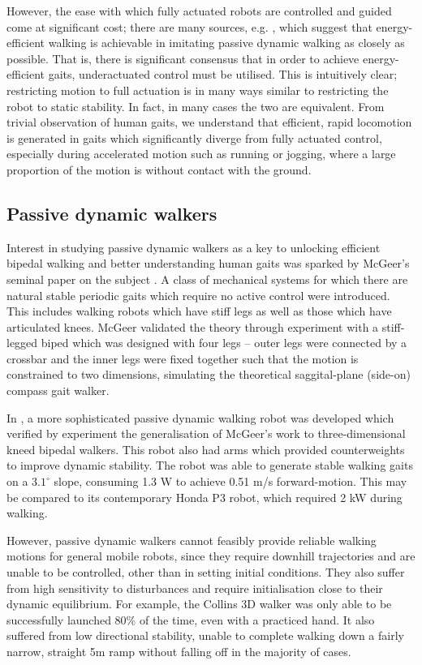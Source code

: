 However, the ease with which fully actuated robots are controlled and guided come at significant cost; there are many sources, e.g. \cite{mcgeer1990passive, asano2007dynamic, byl2008approximate}, which suggest that energy-efficient walking is achievable in imitating passive dynamic walking as closely as possible. That is, there is significant consensus that in order to achieve energy-efficient gaits, underactuated control must be utilised. This is intuitively clear; restricting motion to full actuation is in many ways similar to restricting the robot to static stability. In fact, in many cases the two are equivalent. From trivial observation of human gaits, we understand that efficient, rapid locomotion is generated in gaits which significantly diverge from fully actuated control, especially during accelerated motion such as running or jogging, where a large proportion of the motion is without contact with the ground.

\subsection{Passive dynamic walkers}
Interest in studying passive dynamic walkers as a key to unlocking efficient bipedal walking and better understanding human gaits was sparked by McGeer's seminal paper on the subject \cite{mcgeer1990passive}. A class of mechanical systems for which there are natural stable periodic gaits which require no active control were introduced. This includes walking robots which have stiff legs as well as those which have articulated knees. McGeer validated the theory through experiment with a stiff-legged biped which was designed with four legs -- outer legs were connected by a crossbar and the inner legs were fixed together such that the motion is constrained to two dimensions, simulating the theoretical saggital-plane (side-on) compass gait walker.

In \cite{collins2001three}, a more sophisticated passive dynamic walking robot was developed which verified by experiment the generalisation of McGeer's work to three-dimensional kneed bipedal walkers. This robot also had arms which provided counterweights to improve dynamic stability. The robot was able to generate stable walking gaits on a $3.1^{\circ}$ slope, consuming 1.3 W to achieve 0.51 m/s forward-motion. This may be compared to its contemporary Honda P3 robot, which required 2 kW during walking.

However, passive dynamic walkers cannot feasibly provide reliable walking motions for general mobile robots, since they require downhill trajectories and are unable to be controlled, other than in setting initial conditions. They also suffer from high sensitivity to disturbances and require initialisation close to their dynamic equilibrium. For example, the Collins 3D walker was only able to be successfully launched 80\% of the time, even with a practiced hand. It also suffered from low directional stability, unable to complete walking down a fairly narrow, straight 5m ramp without falling off in the majority of cases.

